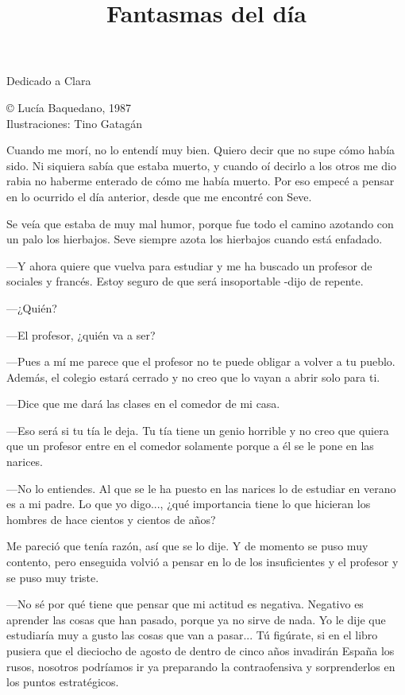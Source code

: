 \documentclass{barcodevapor3pags}
\title{Fantasmas del día}
\author{}
\date{}
\begin{document}

\maketitle
\begin{center}
{Dedicado a Clara}


\vspace{3cm}

\small
© Lucía Baquedano, 1987\\
Ilustraciones: Tino Gatagán\\

\end{center}

\clearpage
\capitulo
{\Large C}uando me morí, no lo entendí muy bien. Quiero decir que no supe cómo
había sido. Ni siquiera sabía que estaba muerto, y cuando oí decirlo a
los otros me dio rabia no haberme enterado de cómo me había muerto. Por
eso empecé a pensar en lo ocurrido el día anterior, desde que me
encontré con Seve.

Se veía que estaba de muy mal humor, porque fue todo el camino azotando
con un palo los hierbajos. Seve siempre azota los hierbajos cuando está
enfadado.~

---Y ahora quiere que vuelva para estudiar y me ha buscado un profesor
de sociales y francés. Estoy seguro de que será insoportable -dijo de
repente.~

---¿Quién?~

---El profesor, ¿quién va a ser?~

---Pues a mí me parece que el profesor no te puede obligar a volver a tu
pueblo. Además, el colegio estará cerrado y no creo que lo vayan a abrir
solo para ti.~

---Dice que me dará las clases en el comedor de mi casa.~

---Eso será si tu tía le deja. Tu tía tiene un genio horrible y no creo
que quiera que un profesor entre en el comedor solamente porque a él se
le pone en las narices.~

---No lo entiendes. Al que se le ha puesto en las narices lo de estudiar
en verano es a mi padre. Lo que yo digo..., ¿qué importancia tiene lo
que hicieran los hombres de hace cientos y cientos de años?~

Me pareció que tenía razón, así que se lo dije. Y de momento se puso muy
contento, pero enseguida volvió a pensar en lo de los insuficientes y el
profesor y se puso muy triste.~

---No sé por qué tiene que pensar que mi actitud es negativa. Negativo
es aprender las cosas que han pasado, porque ya no sirve de nada. Yo le
dije que estudiaría muy a gusto las cosas que van a pasar... Tú
figúrate, si en el libro pusiera que el dieciocho de agosto de dentro de
cinco años invadirán España los rusos, nosotros podríamos ir ya
preparando la contraofensiva y sorprenderlos en los puntos estratégicos.
\end{document}

